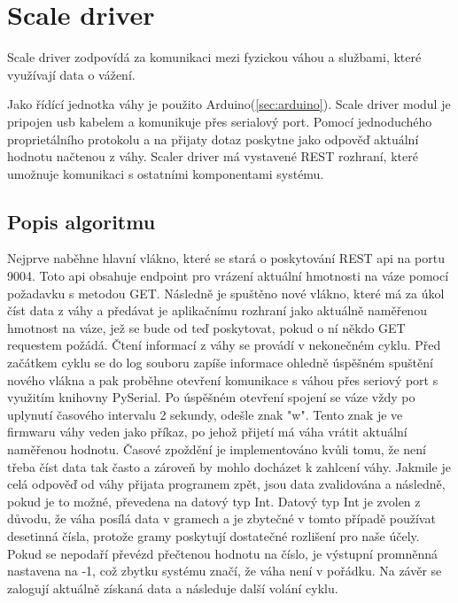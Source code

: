 \section{Scale driver}\label{sec:scale-driver}
Scale driver zodpovídá za komunikaci mezi fyzickou váhou a službami, které využívají data o vážení.\newline

Jako řídící jednotka váhy je použito Arduino(\ref{sec:arduino}).
Scale driver modul je pripojen usb kabelem a komunikuje přes serialový port.
Pomocí jednoduchého proprietálního protokolu a na přijaty dotaz  poskytne jako odpověď aktuální hodnotu načtenou z váhy.
Scaler driver má vystavené REST rozhraní, které umožnuje komunikaci s ostatními komponentami systému.

\subsection*{Popis algoritmu}
Nejprve naběhne hlavní vlákno, které se stará o poskytování REST api na portu 9004.
Toto api obsahuje endpoint pro vrázení aktuální hmotnosti na váze pomocí požadavku s metodou GET.
Následně je spuštěno nové vlákno, které má za úkol číst data z váhy a předávat je aplikačnímu rozhraní jako aktuálně naměřenou hmotnost na váze, jež se bude od teď poskytovat, pokud o ní někdo GET requestem požádá.
Čtení informací z váhy se provádí v nekonečném cyklu.
Před začátkem cyklu se do log souboru zapíše informace ohledně úspěšném spuštění nového vlákna a pak proběhne otevření komunikace s váhou přes seriový port s využitím knihovny PySerial.
Po úspěšném otevření spojení se váze vždy po uplynutí časového intervalu 2 sekundy, odešle znak "w".
Tento znak je ve firmwaru váhy veden jako příkaz, po jehož přijetí má váha vrátit aktuální naměřenou hodnotu.
Časové zpoždění je implementováno kvůli tomu, že není třeba číst data tak často a zároveň by mohlo docházet k zahlcení váhy.
Jakmile je celá odpověď od váhy přijata programem zpět, jsou data zvalidována a následně, pokud je to možné, převedena na datový typ Int.
Datový typ Int je zvolen z důvodu, že váha posílá data v gramech a je zbytečné v tomto případě používat desetinná čísla, protože gramy poskytují dostatečné rozlišení pro naše účely.
Pokud se nepodaří převézd přečtenou hodnotu na číslo, je výstupní promněnná nastavena na -1, což zbytku systému značí, že váha není v pořádku.
Na závěr se zalogují aktuálně získaná data a následuje další volání cyklu.


